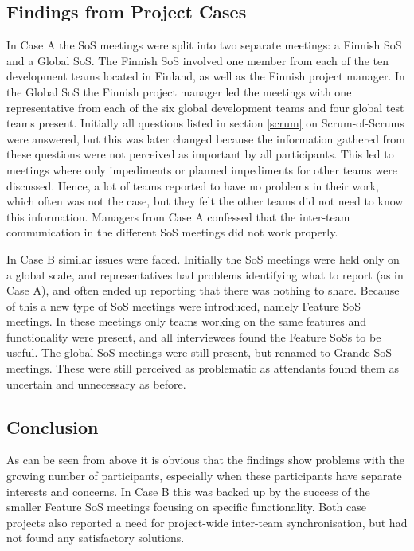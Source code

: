 \subsection{Findings from Project Cases}
\label{paasivaara}

In Case A the SoS meetings were split into two separate meetings: a Finnish SoS and a Global SoS. The Finnish SoS involved one member from each of the ten development teams located in Finland, as well as the Finnish project manager. In the Global SoS the Finnish project manager led the meetings with one representative from each of the six global development teams and four global test teams present. Initially all questions listed in section \ref{scrum} on Scrum-of-Scrums were answered, but this was later changed because the information gathered from these questions were not perceived as important by all participants. This led to meetings where only impediments or planned impediments for other teams were discussed. Hence, a lot of teams reported to have no problems in their work, which often was not the case, but they felt the other teams did not need to know this information. Managers from Case A confessed that the inter-team communication in the different SoS meetings did not work properly.

In Case B similar issues were faced. Initially the SoS meetings were held only on a global scale, and representatives had problems identifying what to report (as in Case A), and often ended up reporting that there was nothing to share. Because of this a new type of SoS meetings were introduced, namely Feature SoS meetings. In these meetings only teams working on the same features and functionality were present, and all interviewees found the Feature SoSs to be useful. The global SoS meetings were still present, but renamed to Grande SoS meetings. These were still perceived as problematic as attendants found them as uncertain and unnecessary as before.

\subsection{Conclusion}

As can be seen from above it is obvious that the findings show problems with the growing number of participants, especially when these participants have separate interests and concerns. In Case B this was backed up by the success of the smaller Feature SoS meetings focusing on specific functionality. Both case projects also reported a need for project-wide inter-team synchronisation, but had not found any satisfactory solutions.

